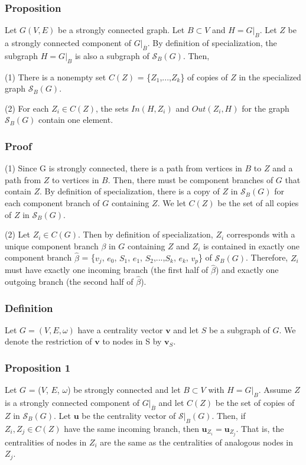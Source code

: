 \documentclass{paper}
\begin{document}
\subsubsection*{Proposition}
Let $G(V,E)$ be a strongly connected graph. Let $B \subset V$ and $H = G|_B$. 
Let $Z$ be a strongly connected component of $G|_{\overline{B}}$. 
By definition of specialization, the subgraph $H = G|_{B}$ is also a subgraph 
of $\mathcal{S}_B(G)$. Then,

(1) There is a nonempty set $C(Z)$ = \{$Z_1$,...,$Z_k$\} of copies of $Z$ in the specialized graph $\mathcal{S}_B(G)$. 

(2) For each $Z_i \in C(Z)$, the sets $In(H,Z_i)$ and $Out(Z_i,H)$ for the graph $\mathcal{S}_B(G)$ contain one element.


\subsubsection*{Proof}

(1) Since G is strongly connected, there is a path from vertices in $B$ to $Z$ and a path from $Z$ to vertices in $B$. 
Then, there must be component branches of $G$ that contain $Z$. By definition of specialization, there is a copy of $Z$ in $\mathcal{S}_{B}(G)$ for each component branch of $G$ containing $Z$. We let $C(Z)$ be the set of all copies of $Z$ in $\mathcal{S}_{B}(G)$.

(2) Let $Z_i \in C(G)$. Then by definition of specialization, $Z_i$ corresponds with a unique component branch $\beta$ in $G$ containing $Z$ and $Z_i$ is contained in exactly one component branch $\hat{\beta}$ = \{$v_j$, $e_0$, $S_1$, $e_1$, $S_2$,...,$S_k$, $e_k$, $v_p$\} of $\mathcal{S}_{B}(G)$. Therefore, $Z_i$ must have exactly one incoming branch (the first half of $\hat{\beta}$) and exactly one outgoing branch (the second half of $\hat{\beta}$).

\subsubsection*{Definition} Let $G = (V,E,\omega)$ have a centrality vector $\mathbf{v}$ and let $S$ be a subgraph of $G$. We denote the restriction of $\mathbf{v}$ to nodes in S by $\mathbf{v}_S$.

\subsubsection*{Proposition 1} Let $G$ = ($V$, $E$, $\omega$) be strongly connected and let $B \subset V$ with $H = G|_B$. Assume $Z$ is a strongly connected component of $G|_{\overline{B}}$ and let $C(Z)$ be the set of copies of $Z$ in $\mathcal{S}_B(G)$. Let $\mathbf{u}$ be the centrality vector of $\mathcal{S}|_B(G)$. Then, if $Z_i, Z_j \in C(Z)$ have the same incoming branch, then $\mathbf{u}_{Z_i} = \mathbf{u}_{Z_j}$. That is, the centralities of nodes in $Z_i$ are the same as the centralities of analogous nodes in $Z_j$.
\end{document}
